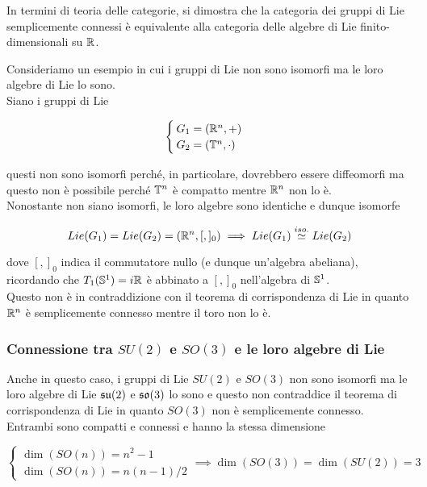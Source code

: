\begin{remark}
	In termini di teoria delle categorie, si dimostra che la categoria dei gruppi di Lie semplicemente connessi è equivalente alla categoria delle algebre di Lie finito-dimensionali su $ \R $.
\end{remark}

Consideriamo un esempio in cui i gruppi di Lie non sono isomorfi ma le loro algebre di Lie lo sono.\\
Siano i gruppi di Lie

\begin{equation}
	\begin{cases}
		G_{1} = (\R^{n},+) \\
		G_{2} = (\T^{n},\cdot)
	\end{cases}
\end{equation}

questi non sono isomorfi perché, in particolare, dovrebbero essere diffeomorfi ma questo non è possibile perché $ \T^{n} $ è compatto mentre $ \R^{n} $ non lo è.\\
Nonostante non siano isomorfi, le loro algebre sono identiche e dunque isomorfe

\begin{equation}
	Lie(G_{1}) = Lie(G_{2}) = (\R^{n},[,]_{0}) %
	\implies %
	Lie(G_{1}) \stackrel{iso.}{\simeq} Lie(G_{2})
\end{equation}

dove $ [,]_{0} $ indica il commutatore nullo (e dunque un'algebra abeliana), ricordando che $ T_{1}(\S^{1}) = i \R $ è abbinato a $ [,]_{0} $ nell'algebra di $ \S^{1} $.\\
Questo non è in contraddizione con il teorema di corrispondenza di Lie in quanto $ \R^{n} $ è semplicemente connesso mentre il toro non lo è.

\subsubsection{Connessione tra $ SU(2) $ e $ SO(3) $ e le loro algebre di Lie}

Anche in questo caso, i gruppi di Lie $ SU(2) $ e $ SO(3) $ non sono isomorfi ma le loro algebre di Lie $ \su(2) $ e $ \so(3) $ lo sono e questo non contraddice il teorema di corrispondenza di Lie in quanto $ SO(3) $ non è semplicemente connesso.\\
Entrambi sono compatti e connessi e hanno la stessa dimensione

\begin{equation}
	\begin{cases}
		\dim(SO(n)) = n^{2} - 1\\
		\dim(SO(n)) = n(n-1)/2
	\end{cases}
	\implies%
	\dim(SO(3)) = \dim(SU(2)) = 3
\end{equation}

